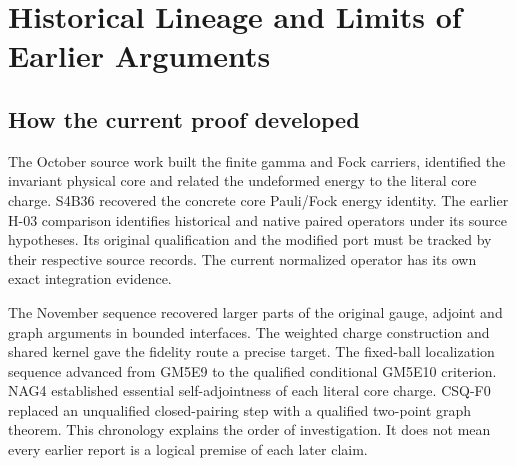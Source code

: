 \chapter{Historical Lineage and Limits of Earlier Arguments}\label{app:lineage}
\section{How the current proof developed}
The October source work built the finite gamma and Fock carriers, identified the invariant physical core and related the undeformed energy to the literal core charge. S4B36 recovered the concrete core Pauli/Fock energy identity. The earlier H-03 comparison identifies historical and native paired operators under its source hypotheses. Its original qualification and the modified port must be tracked by their respective source records. The current normalized operator has its own exact integration evidence.

The November sequence recovered larger parts of the original gauge, adjoint and graph arguments in bounded interfaces. The weighted charge construction and shared kernel gave the fidelity route a precise target. The fixed-ball localization sequence advanced from GM5E9 to the qualified conditional GM5E10 criterion. NAG4 established essential self-adjointness of each literal core charge. CSQ-F0 replaced an unqualified closed-pairing step with a qualified two-point graph theorem. This chronology explains the order of investigation. It does not mean every earlier report is a logical premise of each later claim.

